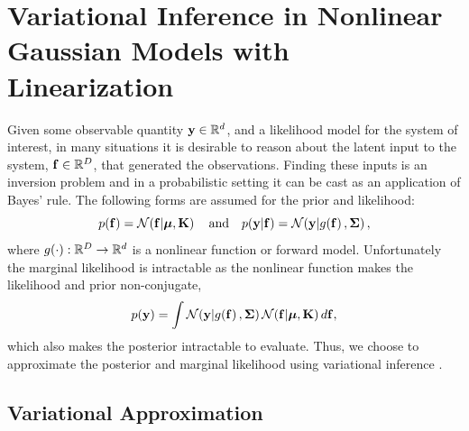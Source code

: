 \documentclass{article} %
\begin{document}
\section{Variational Inference in Nonlinear Gaussian Models with Linearization}
\label{sec:gausmod}

Given some observable quantity $\mathbf{y} \in \mathbb{R}^{d}$, and a likelihood model for
the system of interest, in many situations it is desirable to reason about the
latent input to the system, $\mathbf{f}\in\mathbb{R}^{D}$, that generated the
observations. Finding these inputs is an inversion problem and in a
probabilistic setting it can be cast as an application of Bayes' rule.
The following forms are assumed for the prior and likelihood:
\begin{equation}
    p\!\left({\mathbf{f}}\right) = \mathcal{N}\!\left({\mathbf{f}}\middle\vert{\ensuremath{\boldsymbol{\mu}}, \ensuremath{\mathbf{K}}}\right)
    \quad \text{and} \quad
    p\!\left({\mathbf{y}}\middle\vert{\ensuremath{\mathbf{f}}}\right) = \mathcal{N}\!\left({\mathbf{y}}\middle\vert{\ensuremath{g\!\left({{\mathbf{f}}}\right)}, \ensuremath{\boldsymbol{\Sigma}}}\right),
    \label{eq:priorlike}
\end{equation}
where $g\!\left({{\cdot}}\right) : \mathbb{R}^{D} \to \mathbb{R}^{d}$ is a nonlinear function or
forward model. Unfortunately the marginal likelihood is intractable %
as %
the nonlinear function makes the likelihood and prior non-conjugate,
\begin{equation}
    p\!\left({\mathbf{y}}\right) = \int \mathcal{N}\!\left({\mathbf{y}}\middle\vert{\ensuremath{g\!\left({{\mathbf{f}}}\right)}, \ensuremath{\boldsymbol{\Sigma}}}\right)
        \mathcal{N}\!\left({\mathbf{f}}\middle\vert{\ensuremath{\boldsymbol{\mu}}, \ensuremath{\mathbf{K}}}\right) d\mathbf{f},
    \label{eq:marglike}
\end{equation}
which also makes the posterior intractable to evaluate. Thus, we choose to
approximate the posterior and marginal likelihood using variational inference
\cite{Jordan1999}.


\subsection{Variational Approximation}
\end{document}
